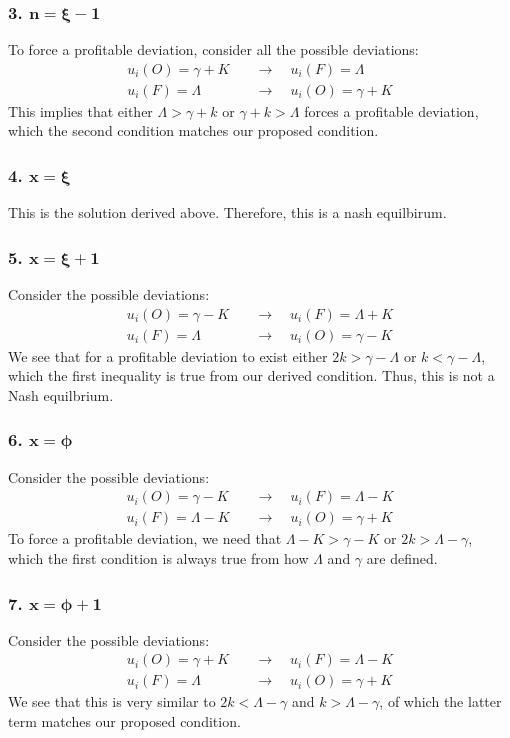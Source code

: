 \documentclass[12pt]{article}
\begin{document}
\subsubsection*{3. $\mathbf{n = \xi - 1}$} 
To force a profitable deviation, 
consider all the possible deviations:
\begin{align*}
    u_i(O) = \gamma + K \quad &\to \quad u_i(F) = \Lambda \\
    u_i(F) = \Lambda \quad &\to \quad u_i(O) = \gamma + K
\end{align*}
This implies that either $\Lambda > \gamma + k$ or $\gamma + k > \Lambda$ forces a profitable deviation, which the second condition matches our proposed condition. 
\subsubsection*{4. $\mathbf{x = \xi}$}
This is the solution derived above. Therefore, this is a nash equilbirum. 
\subsubsection*{5. $\mathbf{x = \xi + 1}$}
Consider the possible deviations:
\begin{align*}
    u_i(O) = \gamma - K \quad &\to \quad u_i(F) = \Lambda + K \\
    u_i(F) = \Lambda \quad &\to \quad u_i(O) = \gamma - K
\end{align*}
We see that for a profitable deviation to exist either $2k > \gamma - \Lambda$ or $k < \gamma - \Lambda$, which the first inequality is true from our derived condition. Thus, this is not a Nash equilbrium. 
\subsubsection*{6. $\mathbf{x = \phi}$}
Consider the possible deviations:
\begin{align*}
    u_i(O) = \gamma - K \quad &\to \quad u_i(F) = \Lambda - K \\
    u_i(F) = \Lambda - K\quad &\to \quad u_i(O) = \gamma + K
\end{align*}
To force a profitable deviation, we need that $\Lambda - K > \gamma - K$ or $2k > \Lambda - \gamma$, which the first condition is always true from how $\Lambda$ and $\gamma$ are defined. 
\subsubsection*{7. $\mathbf{x = \phi + 1}$}
Consider the possible deviations:
\begin{align*}
    u_i(O) = \gamma + K \quad &\to \quad u_i(F) = \Lambda - K \\
    u_i(F) = \Lambda \quad &\to \quad u_i(O) = \gamma + K
\end{align*}
We see that this is very similar to $2k < \Lambda - \gamma$ and $k > \Lambda - \gamma$, of which the latter term matches our proposed condition. 
\end{document}
